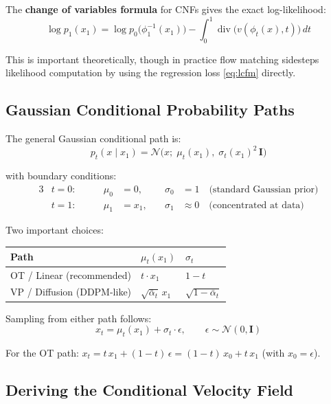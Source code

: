\documentclass[11pt, a4paper]{article}
\newcommand{\alphabar}{\bar{\alpha}}
\newcommand{\N}{\mathcal{N}}
\newcommand{\Id}{\mathbf{I}}
\DeclareMathOperator{\Div}{div}
\begin{document}
The \textbf{change of variables formula} for CNFs gives the exact log-likelihood:
\begin{equation}
  \log p_1(x_1) = \log p_0\bigl(\phi_1^{-1}(x_1)\bigr)
  - \int_0^1 \Div\bigl(v(\phi_t(x), t)\bigr)\, dt
\end{equation}

This is important theoretically, though in practice flow matching sidesteps
likelihood computation by using the regression loss \eqref{eq:lcfm} directly.

\subsection{Gaussian Conditional Probability Paths}

The general Gaussian conditional path is:
\begin{equation}
  p_t(x \mid x_1) = \N\!\bigl(x;\; \mu_t(x_1),\; \sigma_t(x_1)^2\,\Id\bigr)
\end{equation}

with boundary conditions:
\begin{alignat}{3}
  &t = 0: &\qquad \mu_0 &= 0, &\quad \sigma_0 &= 1
    \quad \text{(standard Gaussian prior)} \\
  &t = 1: &\qquad \mu_1 &= x_1, &\quad \sigma_1 &\approx 0
    \quad \text{(concentrated at data)}
\end{alignat}

Two important choices:

\renewcommand{\arraystretch}{1.5}
\begin{center}
\begin{tabular}{@{} l l l @{}}
\toprule
\textbf{Path} & $\mu_t(x_1)$ & $\sigma_t$ \\
\midrule
OT / Linear (recommended) & $t \cdot x_1$ & $1 - t$ \\
VP / Diffusion (DDPM-like) & $\sqrt{\alphabar_t}\, x_1$
  & $\sqrt{1 - \alphabar_t}$ \\
\bottomrule
\end{tabular}
\end{center}

Sampling from either path follows:
\begin{equation}
  x_t = \mu_t(x_1) + \sigma_t \cdot \epsilon, \qquad \epsilon \sim \N(0, \Id)
\end{equation}

For the OT path: $x_t = t\, x_1 + (1-t)\,\epsilon = (1-t)\,x_0 + t\,x_1$
(with $x_0 = \epsilon$).

\subsection{Deriving the Conditional Velocity Field}
\end{document}
